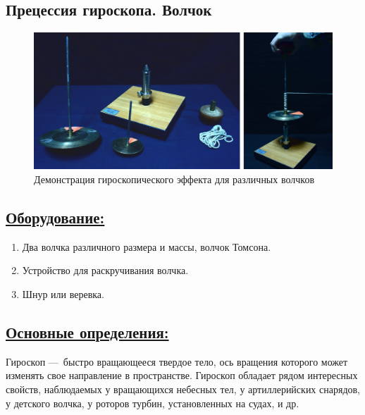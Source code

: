 \documentclass[14pt,a4paper,oneside]{extarticle}	%
\begin{document}
	
	
	\begin{center}
		\subsection*{Прецессия гироскопа. Волчок}
	\end{center}
	
	\begin{figure}[H] 	
		\centering 	
		\includegraphics[width=0.9\linewidth]{gyro-4.png}
		\caption{Демонстрация гироскопического эффекта для различных волчков}
		\label{gyro-4}
	\end{figure}
	
	\subsection*{\underline{Оборудование:}}

			\begin{enumerate} 
			\item Два волчка различного размера и массы, волчок Томсона.
			\item Устройство для раскручивания волчка.
			\item Шнур или веревка.
		\end{enumerate}

		\subsection*{\underline{Основные определения:}}
	
	Гироскоп — быстро вращающееся твердое тело, ось вращения которого может изменять 
	свое направление в пространстве.
	Гироскоп обладает рядом интересных свойств, наблюдаемых у вращающихся небесных тел, у артиллерийских снарядов, у детского волчка, у роторов турбин, установленных на судах, и др.
	
\end{document}
